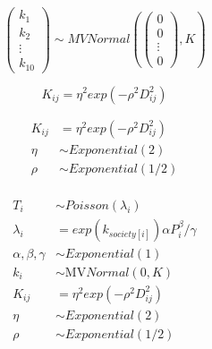 \documentclass[10pt]{book}
\begin{document}
\begin{mdSnippets}
\begin{mdDisplaySnippet}[04e76752b8d40592e7edbcbe77215f76]%
\[%
\begin{pmatrix}
k_1 \\
k_2 \\
\vdots \\
k_{10}
\end{pmatrix} \sim 
MVNormal \left ( 
\begin{pmatrix}
0 \\
0 \\
\vdots \\
0
\end{pmatrix}, 
K
\right )
\]%
\end{mdDisplaySnippet}%
\begin{mdDisplaySnippet}[dee862468f0e3783c6a87f9ea9a36782]%
\[%
K_{ij}  = \eta^2 exp(-\rho^2 D^2_{ij})
\]%
\end{mdDisplaySnippet}%
\begin{mdDisplaySnippet}[8e617013fe018d7d95945fd4ae3c29a4]%
\[%
\begin{aligned}
K_{ij}  &= \eta^2 exp(-\rho^2 D^2_{ij})  \\
\eta &\sim Exponential(2) \\
\rho &\sim Exponential(1/2) \\
\end{aligned}
\]%
\end{mdDisplaySnippet}%
\begin{mdDisplaySnippet}[1135dbf386203f18a4fb5fe7a40ce1d7]%
\[%
\begin{aligned}
T_i &\sim Poisson(\lambda_i) \\
\lambda_i &= exp(k_{society[i]}) \alpha P_i ^ \beta / \gamma \\
\alpha, \beta, \gamma &\sim Exponential(1) \\
k_i &\sim \text{MV}Normal(0, K) \\
K_{ij}  &= \eta^2 exp(-\rho^2 D^2_{ij})  \\
\eta &\sim Exponential(2) \\
\rho &\sim Exponential(1/2) \\
\end{aligned}
\]%
\end{mdDisplaySnippet}%

\end{mdSnippets}
\end{document}
